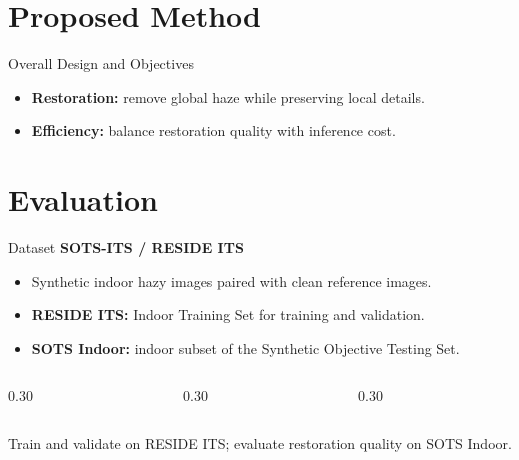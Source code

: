 \documentclass[aspectratio=169,10pt]{beamer}
\newcommand{\key}[1]{\textbf{\color{uetblue}#1}}
\begin{document}
\section{Proposed Method}
\begin{frame}{Overall Design and Objectives}
  \centering
  
  \par\vspace{0.32cm}
  \begin{itemize}
    \setlength{\itemsep}{0.16cm}
    \item \key{Restoration:} remove global haze while preserving local details.
    \item \key{Efficiency:} balance restoration quality with inference cost.
  \end{itemize}
  \raggedright
\end{frame}

\section{Evaluation}
\begin{frame}{Dataset}
  {\large\key{SOTS-ITS / RESIDE ITS}}
  \vspace{0.20cm}
  \begin{itemize}
    \setlength{\itemsep}{0.13cm}
    \item Synthetic indoor hazy images paired with clean reference images.
    \item \key{RESIDE ITS:} Indoor Training Set for training and validation.
    \item \key{SOTS Indoor:} indoor subset of the Synthetic Objective Testing Set.
  \end{itemize}
  \vspace{0.30cm}
  \begin{columns}[T,onlytextwidth]
    \begin{column}{0.30\textwidth}
    \end{column}
    \begin{column}{0.30\textwidth}
    \end{column}
    \begin{column}{0.30\textwidth}
    \end{column}
  \end{columns}
  \vspace{0.25cm}
  {\small\color{uetgray}Train and validate on RESIDE ITS; evaluate restoration quality on SOTS Indoor.}
\end{frame}
\end{document}
